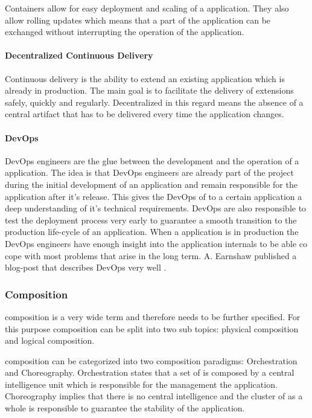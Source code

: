Containers allow for easy deployment and scaling of a \ms{} application. They
also allow rolling updates which means that a part of the application can be
exchanged without interrupting the operation of the application.

\paragraph{Decentralized Continuous Delivery}

Continuous delivery is the ability to extend an existing \ms{} application which
is already in production. The main goal is to facilitate the delivery of
extensions safely, quickly and regularly. Decentralized in this regard means the
absence of a central artifact that has to be delivered every time the
application changes.

\paragraph{DevOps}

DevOps engineers are the glue between the development and the operation of a
\ms{} application. The idea is that DevOps engineers are already part of the
project during the initial development of an application and remain responsible
for the application after it's release. This gives the DevOps of to a certain
application a deep understanding of it's technical requirements. DevOps are also
responsible to test the deployment process very early to guarantee a smooth
transition to the production life-cycle of an application. When a \ms{}
application is in production the DevOps engineers have enough insight into the
application internals to be able co cope with most problems that arise in the
long term. A. Earnshaw published a blog-post that describes DevOps very
well \cite{earnshaw2013devops}.

\subsubsection{\ms{} Composition}
\label{subsub:composition}

\ms{} composition is a very wide term and therefore needs to be further
specified. For this purpose composition can be split into two sub topics:
physical composition and logical composition.

\ms{} composition can be categorized into two composition paradigms:
Orchestration and Choreography. Orchestration states that a set of \mss{} is
composed by a central intelligence unit which is responsible for the management
the application. Choreography implies that there is no central intelligence
and the cluster of \mss{} as a whole is responsible to guarantee the stability
of the application.


